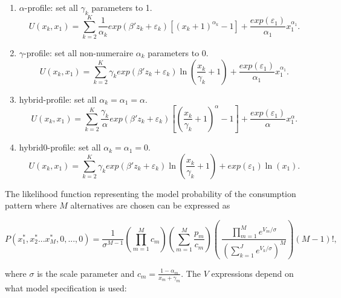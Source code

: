 \begin{enumerate}
\def\labelenumi{\arabic{enumi}.}
\item
  \(\alpha\)-profile: set all \(\gamma_k\) parameters to 1.
  \begin{equation}
  \label{eq:alpha}
  U(x_k, x_1) = \sum_{k=2}^{K} \frac{1}{\alpha_k}exp(\beta'z_k+\varepsilon_k) \left[ \left( x_k + 1 \right)^{\alpha_k} - 1 \right] + \frac{exp(\varepsilon_1)}{\alpha_1}x_1^{\alpha_1}.
  \end{equation}
\item
  \(\gamma\)-profile: set all non-numeraire \(\alpha_k\) parameters to
  0. \begin{equation}
  \label{eq:gamma}
  U(x_k, x_1) = \sum_{k=2}^{K} \gamma_k exp(\beta'z_k+\varepsilon_k) \ln\left( \frac{x_k}{\gamma_k} + 1 \right) + \frac{exp(\varepsilon_1)}{\alpha_1}x_1^{\alpha_1}.
  \end{equation}
\item
  hybrid-profile: set all \(\alpha_k=\alpha_1=\alpha\). \begin{equation}
  \label{eq:hybrid}
  U(x_k, x_1) = \sum_{k=2}^{K} \frac{\gamma_k}{\alpha} exp(\beta'z_k+\varepsilon_k) \left[ \left( \frac{x_k}{\gamma_k} + 1 \right)^{\alpha} - 1 \right] + \frac{exp(\varepsilon_1)}{\alpha}x_1^{\alpha}.
  \end{equation}
\item
  hybrid0-profile: set all \(\alpha_k=\alpha_1=0\). \begin{equation}
  \label{eq:hybrid0}
  U(x_k, x_1) = \sum_{k=2}^{K} \gamma_k exp(\beta'z_k+\varepsilon_k)  \ln \left( \frac{x_k}{\gamma_k} + 1 \right) + exp(\varepsilon_1) \ln (x_1).
  \end{equation}
\end{enumerate}

The likelihood function representing the model probability of the
consumption pattern where \(M\) alternatives are chosen can be expressed
as \citet{bhatmultiple2008}

\begin{equation}
\label{eq:ll_base}
P(x^{*}_1,x^{*}_2...x^{*}_M,0,...,0) = \frac{1}{\sigma^{M-1}} \left(\prod_{m=1}^M c_m \right)\left(\sum_{m=1}^M \frac{p_m}{c_m} \right) \left( \ \frac{\prod_{m=1}^M e^{V_m/\sigma}}{ \left( \sum_{k=1}^J e^{V_k/\sigma} \right)^M }\right)(M-1)!,
\end{equation}

\noindent where \(\sigma\) is the scale parameter and
\(c_m = \frac{1-\alpha_m}{x_m+ \gamma_m}\). The \(V\) expressions depend
on what model specification is used:

